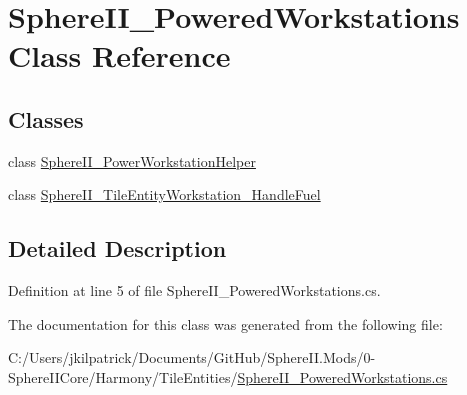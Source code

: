 \hypertarget{class_sphere_i_i___powered_workstations}{}\section{Sphere\+I\+I\+\_\+\+Powered\+Workstations Class Reference}
\label{class_sphere_i_i___powered_workstations}
\subsection*{Classes}
\begin{DoxyCompactItemize}
\item 
class \mbox{\hyperlink{class_sphere_i_i___powered_workstations_1_1_sphere_i_i___power_workstation_helper}{Sphere\+I\+I\+\_\+\+Power\+Workstation\+Helper}}
\item 
class \mbox{\hyperlink{class_sphere_i_i___powered_workstations_1_1_sphere_i_i___tile_entity_workstation___handle_fuel}{Sphere\+I\+I\+\_\+\+Tile\+Entity\+Workstation\+\_\+\+Handle\+Fuel}}
\end{DoxyCompactItemize}


\subsection{Detailed Description}


Definition at line 5 of file Sphere\+I\+I\+\_\+\+Powered\+Workstations.\+cs.



The documentation for this class was generated from the following file\+:\begin{DoxyCompactItemize}
\item 
C\+:/\+Users/jkilpatrick/\+Documents/\+Git\+Hub/\+Sphere\+I\+I.\+Mods/0-\/\+Sphere\+I\+I\+Core/\+Harmony/\+Tile\+Entities/\mbox{\hyperlink{_sphere_i_i___powered_workstations_8cs}{Sphere\+I\+I\+\_\+\+Powered\+Workstations.\+cs}}\end{DoxyCompactItemize}
